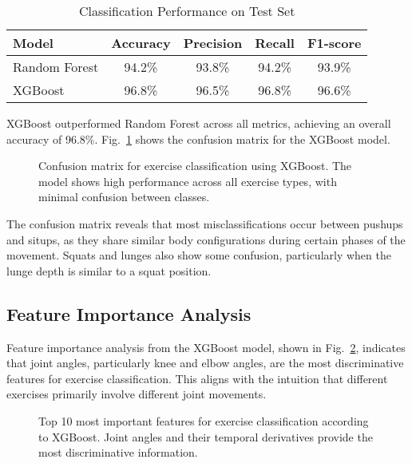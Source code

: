 \documentclass[conference]{IEEEtran}
\begin{document}
\begin{table}[ht]
\centering
\caption{Classification Performance on Test Set}
\label{tab:classification_results}
\begin{tabular}{lcccc}
\toprule
\textbf{Model} & \textbf{Accuracy} & \textbf{Precision} & \textbf{Recall} & \textbf{F1-score} \\
\midrule
Random Forest & 94.2\% & 93.8\% & 94.2\% & 93.9\% \\
XGBoost & 96.8\% & 96.5\% & 96.8\% & 96.6\% \\
\bottomrule
\end{tabular}
\end{table}

XGBoost outperformed Random Forest across all metrics, achieving an overall accuracy of 96.8\%. Fig.~\ref{fig:confusion_matrix} shows the confusion matrix for the XGBoost model.

\begin{figure}[ht]
\centering

\caption{Confusion matrix for exercise classification using XGBoost. The model shows high performance across all exercise types, with minimal confusion between classes.}
\label{fig:confusion_matrix}
\end{figure}

The confusion matrix reveals that most misclassifications occur between pushups and situps, as they share similar body configurations during certain phases of the movement. Squats and lunges also show some confusion, particularly when the lunge depth is similar to a squat position.

\subsection{Feature Importance Analysis}
Feature importance analysis from the XGBoost model, shown in Fig.~\ref{fig:feature_importance}, indicates that joint angles, particularly knee and elbow angles, are the most discriminative features for exercise classification. This aligns with the intuition that different exercises primarily involve different joint movements.

\begin{figure}[ht]
\centering

\caption{Top 10 most important features for exercise classification according to XGBoost. Joint angles and their temporal derivatives provide the most discriminative information.}
\label{fig:feature_importance}
\end{figure}
\end{document}
